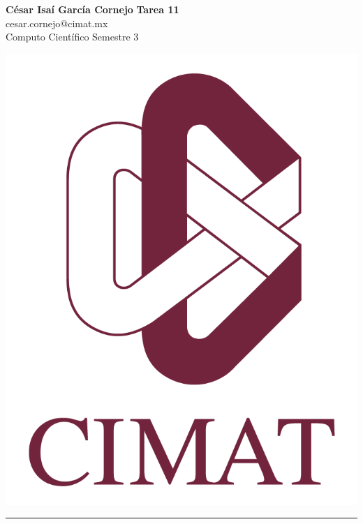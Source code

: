 \documentclass[a4paper, 11pt]{article}
\begin{document}
	\noindent
	
	\begin{minipage}[b][1.2cm][t]{0.8\textwidth}
		\large\textbf{César Isaí García Cornejo} \hfill \textbf{Tarea 11}  \\
		cesar.cornejo@cimat.mx \hfill \\
		\normalsize Computo Científico \hfill Semestre 3\\
	\end{minipage}
	
	\hspace{14.4cm}
	\begin{minipage}[b][0.03cm][t]{0.12\linewidth}
		
		\vspace{-2.2cm}
		\includegraphics[scale=0.3]{Figures/EscudoCimat.png}
	\end{minipage}
	
	\noindent\rule{7in}{2.8pt}
	
\end{document}
